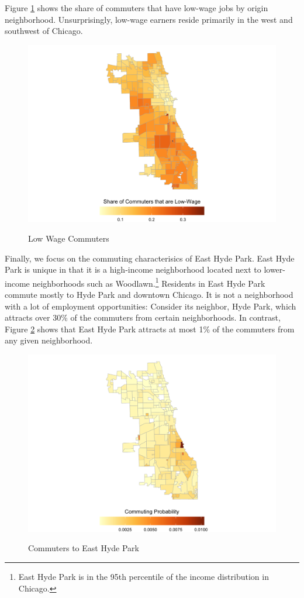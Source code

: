 \documentclass[12pt]{article}
\begin{document}
Figure \ref{fig:lowwage_commute} shows the share of commuters that have low-wage jobs by origin neighborhood. Unsurprisingly, low-wage earners reside primarily in the west and southwest of Chicago. 
\begin{figure}[h!]
    \centering
    \caption{Low Wage Commuters}
    \includegraphics[width=\linewidth]{Pset1/code/lodes_diagnostics_files/figure-html/fig-sharelowtypebyhome-1.png}
    \label{fig:lowwage_commute}
\end{figure}
Finally, we focus on the commuting characterisics of East Hyde Park. East Hyde Park is unique in that it is a high-income neighborhood located next to lower-income neighborhoods such as Woodlawn.\footnote{East Hyde Park is in the 95th percentile of the income distribution in Chicago.} Residents in East Hyde Park commute mostly to Hyde Park and downtown Chicago. It is not a neighborhood with a lot of employment opportunities: Consider its neighbor, Hyde Park, which attracts over 30\% of the commuters from certain neighborhoods. In contrast, Figure \ref{fig:ehp} shows that East Hyde Park attracts at most 1\% of the commuters from any given neighborhood. 
\begin{figure}[h!]
    \centering
    \caption{Commuters to East Hyde Park}
    \includegraphics[width=\linewidth]{Pset1/code/lodes_diagnostics_files/figure-html/unnamed-chunk-12-1.png}
    \label{fig:ehp}
\end{figure}
\end{document}
